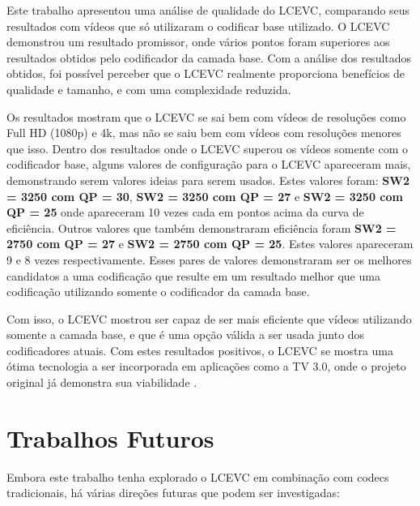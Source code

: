 Este trabalho apresentou uma análise de qualidade do \acrshort{LCEVC}, comparando seus resultados
com vídeos que só utilizaram o codificar base utilizado. O \acrshort{LCEVC} demonstrou um resultado
promissor, onde vários pontos foram superiores aos resultados obtidos pelo codificador da camada base.
Com a análise dos resultados obtidos, foi possível perceber que o \acrshort{LCEVC} realmente proporciona
benefícios de qualidade e tamanho, e com uma complexidade reduzida.

Os resultados mostram que o \acrshort{LCEVC} se sai bem com vídeos de resoluções como Full HD (1080p) e 
4k, mas não se saiu bem com vídeos com resoluções menores que isso. Dentro dos resultados onde o 
\acrshort{LCEVC} superou os vídeos somente com o codificador base, alguns valores de configuração
para o \acrshort{LCEVC} apareceram mais, demonstrando serem valores ideias para serem usados.
Estes valores foram: \textbf{SW2 = 3250 com QP = 30}, \textbf{SW2 = 3250 com QP = 27} e \textbf{SW2 = 3250 com QP = 25}
onde apareceram 10 vezes cada em pontos acima da curva de eficiência. Outros valores que também
demonstraram eficiência foram \textbf{SW2 = 2750 com QP = 27} e \textbf{SW2 = 2750 com QP = 25}. Estes valores
apareceram 9 e 8 vezes respectivamente. Esses pares de valores demonstraram ser os melhores candidatos a 
uma codificação que resulte em um resultado melhor que uma codificação utilizando somente o codificador
da camada base. 

Com isso, o \acrlong{LCEVC} mostrou ser capaz de ser mais eficiente que vídeos utilizando somente a camada
base, e que é uma opção válida a ser usada junto dos codificadores atuais. Com estes resultados positivos,
o \acrshort{LCEVC} se mostra uma ótima tecnologia a ser incorporada em aplicações como a TV 3.0, 
onde o projeto original já demonstra sua viabilidade \cite{tv_25, tv_30}.

\section{Trabalhos Futuros}

Embora este trabalho tenha explorado o \acrshort{LCEVC} em combinação com codecs
tradicionais, há várias direções futuras que podem ser investigadas:

